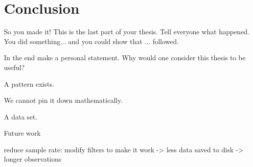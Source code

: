 \chapter{Conclusion}\label{chapter:conclusion} \label{ch:conclusions}
So you made it!
This is the last part of your thesis.
Tell everyone what happened.
You did something... and you could show that ... followed.

In the end make a personal statement.
Why would one consider this thesis to be useful?


A pattern exists.

We cannot pin it down mathematically.

A data set.



Future work

reduce sample rate: modify filters to make it work -> less data saved to disk -> longer observations
